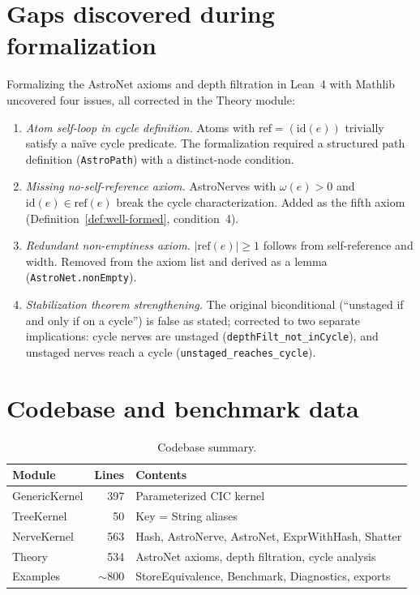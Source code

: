 
\section{Gaps discovered during formalization}\label{app:gaps}

Formalizing the AstroNet axioms and depth filtration in Lean~4 with Mathlib uncovered four issues, all corrected in the Theory module:
\begin{enumerate}
  \item[(a)] \emph{Atom self-loop in cycle definition.} Atoms with $\mathrm{ref} = (\mathrm{id}(e))$ trivially satisfy a na\"ive cycle predicate. The formalization required a structured path definition (\texttt{AstroPath}) with a distinct-node condition.
  \item[(b)] \emph{Missing no-self-reference axiom.} AstroNerves with $\omega(e) > 0$ and $\mathrm{id}(e) \in \mathrm{ref}(e)$ break the cycle characterization. Added as the fifth axiom (Definition~\ref{def:well-formed}, condition~4).
  \item[(c)] \emph{Redundant non-emptiness axiom.} $|\mathrm{ref}(e)| \geq 1$ follows from self-reference and width. Removed from the axiom list and derived as a lemma (\texttt{AstroNet.nonEmpty}).
  \item[(d)] \emph{Stabilization theorem strengthening.} The original biconditional (``unstaged if and only if on a cycle'') is false as stated; corrected to two separate implications: cycle nerves are unstaged (\texttt{depthFilt\_not\_inCycle}), and unstaged nerves reach a cycle (\texttt{unstaged\_reaches\_cycle}).
\end{enumerate}

\section{Codebase and benchmark data}\label{app:codebase}

\begin{table}[H]
\centering\small
\begin{tabular}{lrl}
  \toprule
  Module & Lines & Contents \\
  \midrule
  GenericKernel & 397 & Parameterized CIC kernel \\
  TreeKernel & 50 & Key = String aliases \\
  NerveKernel & 563 & Hash, AstroNerve, AstroNet, ExprWithHash, Shatter \\
  Theory & 534 & AstroNet axioms, depth filtration, cycle analysis \\
  Examples & ${\sim}800$ & StoreEquivalence, Benchmark, Diagnostics, exports \\
  \bottomrule
\end{tabular}
\caption{Codebase summary.}
\label{tab:codebase}
\end{table}

